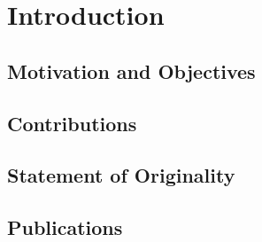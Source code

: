 \chapter{Introduction}

\section{Motivation and Objectives}





\section{Contributions}




\section{Statement of Originality}




\section{Publications}


